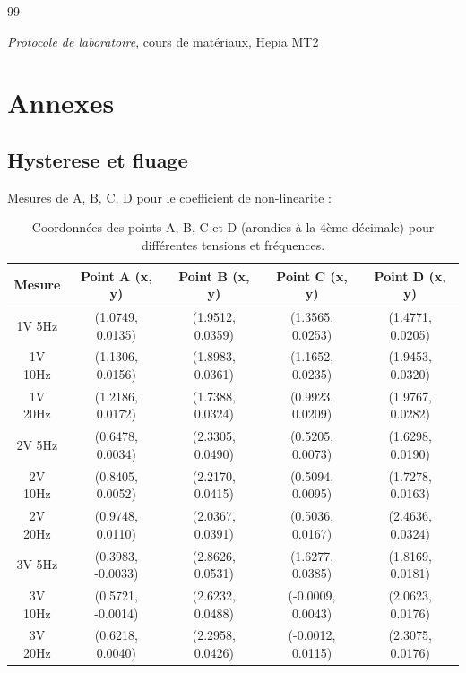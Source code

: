 \begin{thebibliography}{99}

        \textit{Protocole de laboratoire}, cours de matériaux, Hepia MT2 

\end{thebibliography}

\newpage

\section{Annexes}


\subsection{Hysterese et fluage}

Mesures de A, B, C, D pour le coefficient de non-linearite :


\begin{table}[h]
\centering
    \caption{Coordonnées des points A, B, C et D (arondies à la 4ème décimale) pour différentes tensions et fréquences.}
\label{tab:points}
\begin{tabular}{|c|c|c|c|c|}
\hline
\textbf{Mesure} & \textbf{Point A (x, y)} & \textbf{Point B (x, y)} & \textbf{Point C (x, y)} & \textbf{Point D (x, y)} \\
\hline
1V 5Hz & (1.0749, 0.0135) & (1.9512, 0.0359) & (1.3565, 0.0253) & (1.4771, 0.0205) \\
\hline
1V 10Hz & (1.1306, 0.0156) & (1.8983, 0.0361) & (1.1652, 0.0235) & (1.9453, 0.0320) \\
\hline
1V 20Hz & (1.2186, 0.0172) & (1.7388, 0.0324) & (0.9923, 0.0209) & (1.9767, 0.0282) \\
\hline
2V 5Hz & (0.6478, 0.0034) & (2.3305, 0.0490) & (0.5205, 0.0073) & (1.6298, 0.0190) \\
\hline
2V 10Hz & (0.8405, 0.0052) & (2.2170, 0.0415) & (0.5094, 0.0095) & (1.7278, 0.0163) \\
\hline
2V 20Hz & (0.9748, 0.0110) & (2.0367, 0.0391) & (0.5036, 0.0167) & (2.4636, 0.0324) \\
\hline
3V 5Hz & (0.3983, -0.0033) & (2.8626, 0.0531) & (1.6277, 0.0385) & (1.8169, 0.0181) \\
\hline
3V 10Hz & (0.5721, -0.0014) & (2.6232, 0.0488) & (-0.0009, 0.0043) & (2.0623, 0.0176) \\
\hline
3V 20Hz & (0.6218, 0.0040) & (2.2958, 0.0426) & (-0.0012, 0.0115) & (2.3075, 0.0176) \\
\hline
\end{tabular}
\end{table}

